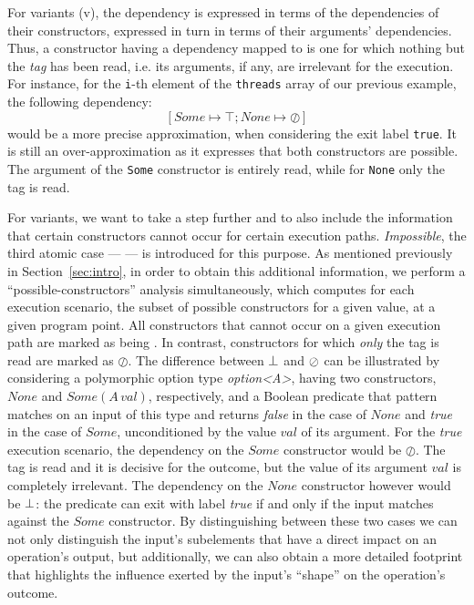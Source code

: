\documentclass[11pt]{article}
\newcommand{\snumber}[1]{\textrm{{\scriptsize(#1)}}}
\newcommand{\disp}[1]{\lstinline&#1&}
\begin{document}
For variants {\snumber{v}}, the dependency is expressed in terms of the 
dependencies of their constructors, expressed in turn in terms of their 
arguments' dependencies. Thus, a constructor having a dependency mapped to 
\nothing{} is one for which nothing but the \emph{tag} has been read, i.e. its 
arguments, if any, are irrelevant for the execution. %
For instance, for the \disp{i}-th element of the \disp{threads} array of our 
previous example, the following dependency:
%
\[
[\mathit{Some} \mapsto \top; \mathit{None} \mapsto \oslash]
\]
%
would be a more precise approximation, when considering the exit label 
\disp{true}. It is still an over-approximation as it expresses that both
constructors are possible. The argument of the \disp{Some} constructor is
entirely read, while for \disp{None} only the tag is read. 

For variants, we want to take a step further and to also include the information 
that certain constructors cannot occur for certain execution paths. \emph{Impossible}, the third 
atomic case --- \impossible{} --- is introduced for this purpose. As mentioned 
previously in Section~\ref{sec:intro}, in order to obtain this additional 
information, we perform a ``possible-constructors'' analysis simultaneously, 
which computes for each execution scenario, the subset of possible constructors 
for a given value, at a given program point. All constructors that cannot occur 
on a given execution path are marked as being \impossible. In contrast, 
constructors for which \emph{only} the tag is read are marked as $\oslash$. The 
difference between $\bot$ and $\oslash$ can be illustrated by 
considering a polymorphic option type \emph{option<A>}, having two constructors, 
$None$ and $\mathit{Some(A \, val)}$, respectively, and a Boolean predicate that 
pattern matches on an input of this type and returns \emph{false} in the case of 
$None$ and \emph{true} in the case of $Some$, unconditioned by the value $val$ of 
its argument. For the \emph{true} execution scenario, the dependency on the 
$Some$ constructor would be $\oslash$. The tag is read and it is decisive for the 
outcome, but the value of its argument $val$ is completely irrelevant. The 
dependency on the $None$ constructor however would be $\bot$: the 
predicate can exit with label \emph{true} if and only if the input matches 
against the $Some$ constructor. By distinguishing between these two cases we 
can not only distinguish the input's subelements that have a direct impact on an 
operation's output, but additionally, we can also obtain a more detailed 
footprint that highlights the influence exerted by the input's ``shape'' on the 
operation's outcome.
\end{document}
